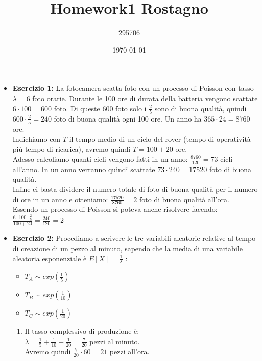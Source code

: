 \documentclass[a4paper,12pt]{article}
\begin{document}
	\title{\textbf{Homework1 Rostagno}}
	\author{295706}
	\date{\today}
	\maketitle
	
	\begin{itemize}
		\item \textbf{Esercizio 1: }La fotocamera scatta foto con un processo di Poisson con tasso $\lambda=6$ foto orarie. Durante le 100 ore di durata della batteria vengono scattate $6\cdot{100}=600$ foto. Di queste 600 foto solo i $\frac{2}{5}$ sono di buona qualità, quindi $600\cdot{\frac{2}{5}}=240$ foto di buona qualità ogni 100 ore. Un anno ha $365\cdot{24}=8760$ ore.\\
		Indichiamo con $T$ il tempo medio di un ciclo del rover (tempo di operatività più tempo di ricarica), avremo quindi $T=100+20$ ore.\\
		Adesso calcoliamo quanti cicli vengono fatti in un anno: $\frac{8760}{120}=73$ cicli all'anno. In un anno verranno quindi scattate $73\cdot{240}=17520$ foto di buona qualità.\\
		Infine ci basta dividere il numero totale di foto di buona qualità per il numero di ore in un anno e otteniamo: $\frac{17520}{8760}=2$ foto di buona qualità all'ora.\\
		Essendo un processo di Poisson si poteva anche risolvere facendo:\\ $\frac{6\cdot100\cdot\frac{2}{5}}{100+20}=\frac{240}{120}=2$
		\newpage
		\item \textbf{Esercizio 2: }Procediamo a scrivere le tre variabili aleatorie relative al tempo di creazione di un pezzo al minuto, sapendo che la media di una variabile aleatoria esponenziale è $E[X]=\frac{1}{\lambda}$ :\\
		\begin{itemize}
			\item $T_A\sim exp(\frac{1}{5})$
			\item $T_B\sim exp(\frac{1}{10})$
			\item $T_C\sim exp(\frac{1}{20})$
		\end{itemize}
		\begin{enumerate}[label=\alph*)]
			\item Il tasso complessivo di produzione è:\\
			$\lambda=\frac{1}{5}+\frac{1}{10}+\frac{1}{20}=\frac{7}{20}$ pezzi al minuto.\\
			Avremo quindi $\frac{7}{20} \cdot 60=21$ pezzi all'ora.\\

\end{enumerate}
\end{itemize}
\end{document}
